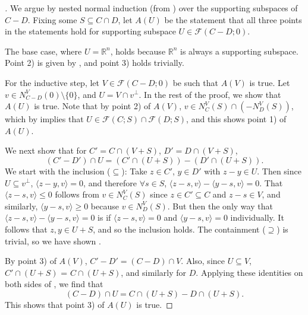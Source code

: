\documentclass{article}
\theoremstyle{plain}
\theoremstyle{definition}
\theoremstyle{remark}
\begin{document}
\begin{proof}[\hypertarget{loc:decomposition_of_supporting_subspaces_of_differences.proof}Proof of \Cref{loc:decomposition_of_supporting_subspaces_of_differences.statement}]

We argue by nested normal induction (from ) over the supporting subspaces of $C-D$. Fixing some $S \subseteq C\cap D$, let $A(U)$ be the statement that all three points in the statements hold for supporting subspace $U \in \mathcal{F}(C-D;0)$.

The base case, where $U = \mathbb{R}^n$, holds because $\mathbb{R}^n$ is always a supporting subspace. Point 2) is given by , and point 3) holds trivially.

For the inductive step, let $V \in \mathcal{F}(C-D;0)$ be such that $A(V)$ is true. Let $v \in N_{C -D}^V(0)\setminus \{ 0 \}$, and $U = V  \cap v^\perp$. In the rest of the proof, we show that $A(U)$ is true. Note that by point 2) of $A(V)$, $v \in N_C^V(S) \cap (-N_D^V(S))$, which by  implies that $U \in \mathcal{F}(C;S) \cap \mathcal{F}(D;S)$, and this shows point 1) of $A(U)$.

We next show that for $C'=C\cap (V+S)$, $D' = D \cap (V+S)$,
\begin{equation}
\label{eq:identity_u}
(C' - D') \cap U = (C' \cap (U+S))-(D' \cap (U+S)).
\end{equation}
We start with the inclusion ($\subseteq$): Take $z \in C'$, $y \in D'$ with $z-y \in U$.
Then since $U \subseteq v^\perp$, $\langle z-y, v\rangle = 0$, and therefore $\forall s \in S$, $\langle z-s, v\rangle - \langle y-s, v\rangle = 0$.
That $\langle z-s, v\rangle \leq 0$ follows from $v \in N_{C}^V(S)$ since $z  \in C' \subseteq C$ and $z-s \in V$, and similarly, $\langle y-s, v\rangle \ge 0$ because $v \in N_D^V(S)$.
But then the only way that $\langle z-s, v\rangle - \langle y-s, v\rangle = 0$
is if $\langle z-s, v\rangle = 0$ and $\langle y-s, v\rangle = 0$ individually.
It follows that $z, y \in U + S$, and so the inclusion holds.
The containment ($\supseteq$) is trivial, so we have shown .

By point 3) of $A(V)$, $C'-D' = (C -D) \cap V$. Also, since $U \subseteq V$, $C' \cap (U+S)$ = $C \cap (U+S)$, and similarly for $D$. Applying these identities on both sides of , we find that
\begin{equation*}
(C - D) \cap U = C \cap (U+S) - D \cap (U+S).
\end{equation*}
This shows that point 3) of $A(U)$ is true.


\end{proof}
\end{document}
